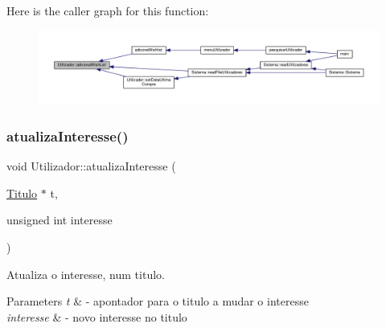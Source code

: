 Here is the caller graph for this function\+:
\nopagebreak
\begin{figure}[H]
\begin{center}
\leavevmode
\includegraphics[width=350pt]{classUtilizador_a45ee0a8d988adbd537e2506d80f96cfb_icgraph}
\end{center}
\end{figure}
\mbox{\label{classUtilizador_a4617169b0764e48f8b95d4d8aa12bf19}} 
\subsubsection{\texorpdfstring{atualiza\+Interesse()}{atualizaInteresse()}}
{\footnotesize\ttfamily void Utilizador\+::atualiza\+Interesse (\begin{DoxyParamCaption}\item[{\hyperlink{classTitulo}{Titulo} $\ast$}]{t,  }\item[{unsigned int}]{interesse }\end{DoxyParamCaption})}



Atualiza o interesse, num titulo. 


\begin{DoxyParams}{Parameters}
{\em t} & -\/ apontador para o titulo a mudar o interesse \\
\hline
{\em interesse} & -\/ novo interesse no titulo \\
\hline
\end{DoxyParams}

